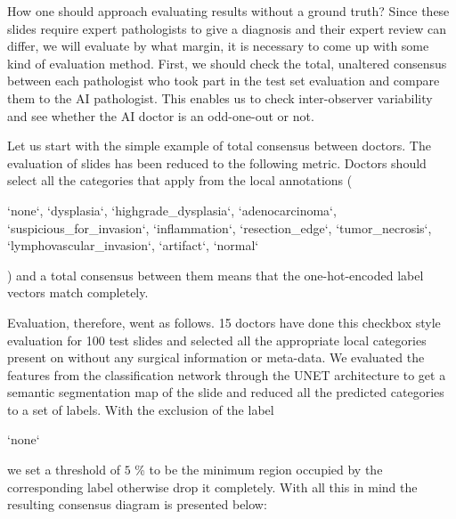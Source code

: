 \documentclass[a4paper,12pt]{article}
\begin{document}
\vspace{7mm}

\par How one should approach evaluating results without a ground truth? Since these slides require expert pathologists to give a diagnosis and their expert review can differ, we will evaluate by what margin, it is necessary to come up with some kind of evaluation method. First, we should check the total, unaltered consensus between each pathologist who took part in the test set evaluation and compare them to the AI pathologist. This enables us to check inter-observer variability and see whether the AI doctor is an odd-one-out or not.

\vspace{4mm}

\par Let us start with the simple example of total consensus between doctors. The evaluation of slides has been reduced to the following metric. Doctors should select all the categories that apply from the local annotations ( \begin{markdown}
`none`, `dysplasia`, `highgrade_dysplasia`, `adenocarcinoma`, 
`suspicious_for_invasion`, `inflammation`, `resection_edge`,
`tumor_necrosis`, `lymphovascular_invasion`, `artifact`, `normal`
\end{markdown} 
) and a total consensus between them means that the one-hot-encoded label vectors match completely.

\vspace{4mm}

\par Evaluation, therefore, went as follows. 15 doctors have done this checkbox style evaluation for 100 test slides and selected all the appropriate local categories present on without any surgical information or meta-data. We evaluated the features from the classification network through the UNET architecture to get a semantic segmentation map of the slide and reduced all the predicted categories to a set of labels. With the exclusion of the label \begin{markdown} `none` 
\end{markdown}
we set a threshold of $5$ \% to be the minimum region occupied by the corresponding label otherwise drop it completely. With all this in mind the resulting consensus diagram is presented below:

\vspace{4mm}
\end{document}
